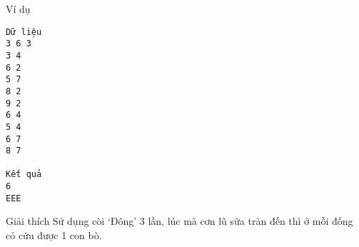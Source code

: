 Ví dụ  
\begin{verbatim}
Dữ liệu
3 6 3
3 4
6 2
5 7
8 2
9 2
6 4
5 4
6 7
8 7

Kết quả
6
EEE
\end{verbatim}
   Giải thích  
Sử dụng còi ‘Đông’ 3 lần, lúc mà cơn lũ sữa tràn đến  thì ở mỗi đống cỏ cứu được 1 con bò.